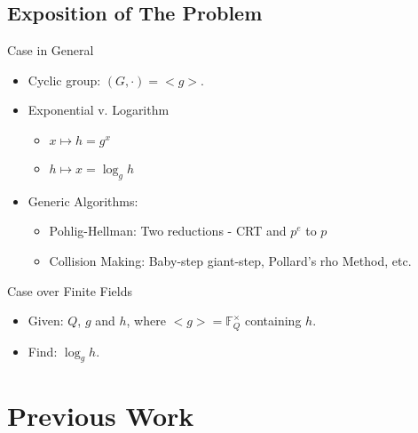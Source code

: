 \documentclass{beamer}
\begin{document}
	\subsection{Exposition of The Problem}
		\begin{frame}{Case in General}
			\begin{itemize}
				\item
					Cyclic group: $(G, \cdot) = <g>$.
				\item
					Exponential v. Logarithm
					\begin{itemize}
						\item
							$x \mapsto h = g^x$
						\item
							$h \mapsto x = \log_g{h}$
					\end{itemize}
				\item
					Generic Algorithms:\\
					\begin{itemize}
						\item
							Pohlig-Hellman: Two reductions - CRT and $p^e$ to $p$
						\item
							Collision Making: Baby-step giant-step, Pollard's rho Method, etc.
					\end{itemize}
			\end{itemize}
		\end{frame}
		
		\begin{frame}{Case over Finite Fields}
			\begin{itemize}
				\item
					Given: $Q$, $g$ and $h$, where $<g> = \mathbb{F}_Q^\times$ containing $h$.
				\item
					Find: $\log_gh$.
			\end{itemize}
		\end{frame}
\section{Previous Work}
\end{document}
